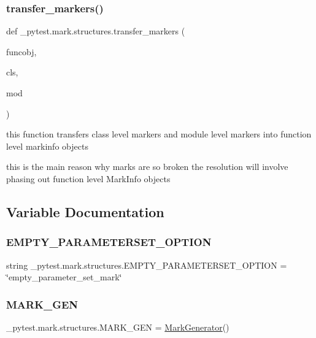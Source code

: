 \subsubsection{\texorpdfstring{transfer\+\_\+markers()}{transfer\_markers()}}
{\footnotesize\ttfamily def \+\_\+pytest.\+mark.\+structures.\+transfer\+\_\+markers (\begin{DoxyParamCaption}\item[{}]{funcobj,  }\item[{}]{cls,  }\item[{}]{mod }\end{DoxyParamCaption})}

\begin{DoxyVerb}this function transfers class level markers and module level markers
into function level markinfo objects

this is the main reason why marks are so broken
the resolution will involve phasing out function level MarkInfo objects\end{DoxyVerb}
 

\subsection{Variable Documentation}
\mbox{\label{namespace__pytest_1_1mark_1_1structures_a71013ca34a3bc8259d61499090a7e5ff}} 
\subsubsection{\texorpdfstring{E\+M\+P\+T\+Y\+\_\+\+P\+A\+R\+A\+M\+E\+T\+E\+R\+S\+E\+T\+\_\+\+O\+P\+T\+I\+ON}{EMPTY\_PARAMETERSET\_OPTION}}
{\footnotesize\ttfamily string \+\_\+pytest.\+mark.\+structures.\+E\+M\+P\+T\+Y\+\_\+\+P\+A\+R\+A\+M\+E\+T\+E\+R\+S\+E\+T\+\_\+\+O\+P\+T\+I\+ON = \char`\"{}empty\+\_\+parameter\+\_\+set\+\_\+mark\char`\"{}}

\mbox{\label{namespace__pytest_1_1mark_1_1structures_ae733896857deec292acbe70730f33a2b}} 
\subsubsection{\texorpdfstring{M\+A\+R\+K\+\_\+\+G\+EN}{MARK\_GEN}}
{\footnotesize\ttfamily \+\_\+pytest.\+mark.\+structures.\+M\+A\+R\+K\+\_\+\+G\+EN = \hyperlink{class__pytest_1_1mark_1_1structures_1_1_mark_generator}{Mark\+Generator}()}

